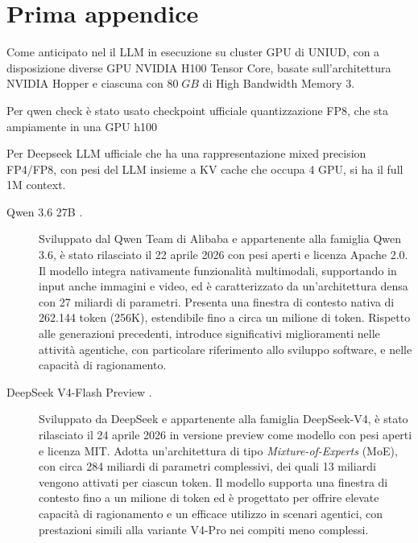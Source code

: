 \chapter{Prima appendice} \label{app:llm}

Come anticipato nel  il LLM in esecuzione su cluster GPU di UNIUD, con a disposizione diverse GPU NVIDIA H100 Tensor Core, basate sull'architettura NVIDIA Hopper e ciascuna con $80 \; GB$ di High Bandwidth Memory 3.

Per qwen check è stato usato checkpoint ufficiale quantizzazione FP8, che sta ampiamente in una GPU h100

Per Deepseek LLM ufficiale che ha una rappresentazione mixed precision FP4/FP8, con pesi del LLM insieme a KV cache che occupa 4 GPU, si ha il full 1M context.


\begin{description}
    \item[Qwen 3.6 27B \cite{alibaba2026qwen3.6-27b}.] Sviluppato dal Qwen Team di Alibaba e appartenente alla famiglia Qwen 3.6, è stato rilasciato il 22 aprile 2026 con pesi aperti e licenza Apache 2.0. Il modello integra nativamente funzionalità multimodali, supportando in input anche immagini e video, ed è caratterizzato da un'architettura densa con 27 miliardi di parametri. Presenta una finestra di contesto nativa di 262.144 token (256K), estendibile fino a circa un milione di token. Rispetto alle generazioni precedenti, introduce significativi miglioramenti nelle attività agentiche, con particolare riferimento allo sviluppo software, e nelle capacità di ragionamento.

    \item[DeepSeek V4-Flash Preview \cite{deepseekai2026deepseekv4}.] Sviluppato da DeepSeek e appartenente alla famiglia DeepSeek-V4, è stato rilasciato il 24 aprile 2026 in versione preview come modello con pesi aperti e licenza MIT. Adotta un'architettura di tipo \emph{Mixture-of-Experts} (MoE), con circa 284 miliardi di parametri complessivi, dei quali 13 miliardi vengono attivati per ciascun token. Il modello supporta una finestra di contesto fino a un milione di token ed è progettato per offrire elevate capacità di ragionamento e un efficace utilizzo in scenari agentici, con prestazioni simili alla variante V4-Pro nei compiti meno complessi.
\end{description}


